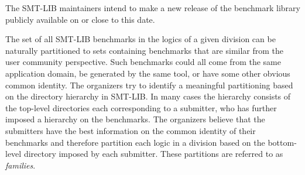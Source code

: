\documentclass[12pt]{article}
\begin{document}
The SMT-LIB
maintainers intend to make a new release of the benchmark library
publicly available on or close to this date.

%
The set of all SMT-LIB benchmarks in the logics of a given division can be
naturally partitioned to sets containing benchmarks that are similar from the
user community perspective.
%
Such benchmarks could all come from the same
application domain, be generated by the same tool, or have some other
obvious common identity.
%
The organizers try to identify a meaningful partitioning based on the
directory hierarchy in SMT-LIB.  In many cases the hierarchy consists of
the top-level directories each corresponding to a submitter, who has
further imposed a hierarchy on the benchmarks.
%
The organizers believe that the submitters have the best information on the
common identity of their benchmarks and therefore partition each logic in a
division based on the bottom-level directory imposed by each submitter.  These
partitions are referred to as \emph{families}.
\end{document}
